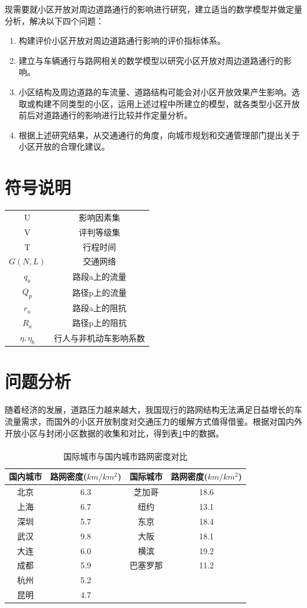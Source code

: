 \documentclass[fontset=windows,a4paper,12pt]{ctexart}
\newcommand{\upcite}[1]{\textsuperscript{\textsuperscript{\cite{#1}}}}
\begin{document}
	现需要就小区开放对周边道路通行的影响进行研究，建立适当的数学模型并做定量分析，解决以下四个问题：
\begin{enumerate}
	\item 构建评价小区开放对周边道路通行影响的评价指标体系。
	\item 建立与车辆通行与路网相关的数学模型以研究小区开放对周边道路通行的影响。
	\item 小区结构及周边道路的车流量、道路结构可能会对小区开放效果产生影响。选取或构建不同类型的小区，运用上述过程中所建立的模型，就各类型小区开放前后对道路通行的影响进行比较并作定量分析。
	\item 根据上述研究结果，从交通通行的角度，向城市规划和交通管理部门提出关于小区开放的合理化建议。
\end{enumerate}
  \section{符号说明}
  \begin{tabular}{c|c}
	\toprule[1pt]
	\makebox[0.4\textwidth][c]{符号}	&  \makebox[0.5\textwidth][c]{意义} \\ \hline
	U				&	影响因素集\\
	V				&	评判等级集\\
	T				&	行程时间\\
	$G(N,L)$		&	交通网络\\
	$q_a$			&	路段a上的流量\\
	$Q_p$			&	路径p上的流量\\
	$r_a$			&	路段a上的阻抗\\
	$R_a$			&	路径p上的阻抗\\
	$\eta,\eta_b$	&	行人与非机动车影响系数\\
	\bottomrule[1pt]
\end{tabular}
  \section{问题分析}
  随着经济的发展，道路压力越来越大，我国现行的路网结构无法满足日益增长的车流量需求，而国外的小区开放制度对交通压力的缓解方式值得借鉴。根据对国内外开放小区与封闭小区数据的收集和对比，得到表\ref{tab:net_density}中的数据。
  \begin{table}[!htbp]
	\centering
	\caption{国际城市与国内城市路网密度对比\upcite{国外街区制是如何完美炼成}}
	\label{tab:net_density}
	\begin{tabular}{cc|cc}
		\toprule[1pt]
		国内城市 & 路网密度($km/km^2$) & 国际城市 & 路网密度($km/km^2$) \\ 
		\hline%
		北京 & 6.3 & 芝加哥 & 18.6 \\ 
		上海 & 6.7 & 纽约 & 13.1 \\ 
		深圳 & 5.7 & 东京 & 18.4 \\ 
		武汉 & 9.8 & 大阪 & 18.1 \\ 
		大连 & 6.0 & 横滨 & 19.2 \\ 
		成都 & 5.9 & 巴塞罗那 & 11.2 \\ 
		杭州 & 5.2 &  &  \\ 
		昆明 & 4.7 &  &  \\ 
		\bottomrule[1pt]
	\end{tabular} 
  \end{table}
  
\end{document}
